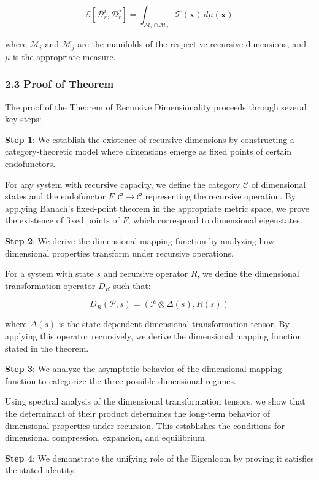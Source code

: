 \documentclass[
]{article}
\begin{document}
\[\mathcal{E}[\mathcal{D}_r^i, \mathcal{D}_r^j] = \int_{\mathcal{M}_i \cap \mathcal{M}_j} \mathcal{T}(\mathbf{x}) \, d\mu(\mathbf{x})\]

where \(\mathcal{M}_i\) and \(\mathcal{M}_j\) are the manifolds of the
respective recursive dimensions, and \(\mu\) is the appropriate measure.

\subsubsection{2.3 Proof of Theorem}\label{proof-of-theorem-1}

The proof of the Theorem of Recursive Dimensionality proceeds through
several key steps:

\textbf{Step 1}: We establish the existence of recursive dimensions by
constructing a category-theoretic model where dimensions emerge as fixed
points of certain endofunctors.

For any system with recursive capacity, we define the category
\(\mathcal{C}\) of dimensional states and the endofunctor
\(F: \mathcal{C} \rightarrow \mathcal{C}\) representing the recursive
operation. By applying Banach's fixed-point theorem in the appropriate
metric space, we prove the existence of fixed points of \(F\), which
correspond to dimensional eigenstates.

\textbf{Step 2}: We derive the dimensional mapping function by analyzing
how dimensional properties transform under recursive operations.

For a system with state \(s\) and recursive operator \(R\), we define
the dimensional transformation operator \(D_R\) such that:

\[D_R(\mathcal{P}, s) = (\mathcal{P} \otimes \Delta(s), R(s))\]

where \(\Delta(s)\) is the state-dependent dimensional transformation
tensor. By applying this operator recursively, we derive the dimensional
mapping function stated in the theorem.

\textbf{Step 3}: We analyze the asymptotic behavior of the dimensional
mapping function to categorize the three possible dimensional regimes.

Using spectral analysis of the dimensional transformation tensors, we
show that the determinant of their product determines the long-term
behavior of dimensional properties under recursion. This establishes the
conditions for dimensional compression, expansion, and equilibrium.

\textbf{Step 4}: We demonstrate the unifying role of the Eigenloom by
proving it satisfies the stated identity.
\end{document}
